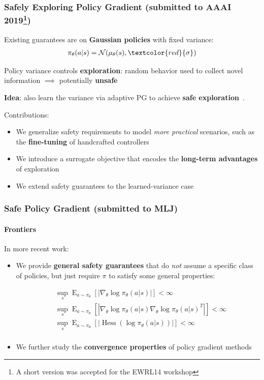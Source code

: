 \documentclass{beamer}
\begin{document}
\begin{frame}
\frametitle{Safely Exploring Policy Gradient \small(submitted to AAAI 2019\footnote{A short version was accepted for the EWRL14 workshop})}
Existing guarantees are on \textbf{Gaussian policies} with fixed variance:
\begin{align*}
	\pi_{\theta}(a \vert s) = \mathcal{N}(\mu_{\theta}(s), \textcolor{red}{\mathbf{\sigma}})
\end{align*}

Policy variance controls \textbf{exploration}: random behavior used to collect novel information $\implies$ potentially \textbf{unsafe}

\vfill

\textbf{Idea}: also learn the variance via adaptive PG to achieve \textbf{safe exploration}~\cite{amodei2016concrete}.

\vfill

Contributions:
\begin{itemize}
	\item We generalize safety requirements to model \textit{more practical} scenarios, such as the \textbf{fine-tuning} of handcrafted controllers
	\item We introduce a surrogate objective that encodes the \textbf{long-term advantages} of exploration
	\item We extend safety guarantees to the learned-variance case
\end{itemize}
\end{frame}


\begin{frame}
\frametitle{Safe Policy Gradient \small(submitted to MLJ)}
\framesubtitle{Frontiers}
In more recent work:
\begin{itemize}
	\item We provide \textbf{general safety guarantees} that do \textit{not} assume a specific class of policies, but just require $\pi$ to satisfy some general properties:
	
	\begin{align*}
		&\sup_{s}\mathop{E}_{a\sim\pi_{\theta}}\left[\left|\nabla_{\theta}\log\pi_{\theta}(a\vert s)\right|\right] < \infty \\
		&\sup_{s}\mathop{E}_{a\sim\pi_{\theta}}\left[\left|\nabla_{\theta}\log\pi_{\theta}(a\vert s)\nabla_{\theta}\log\pi_{\theta}(a\vert s)^T\right|\right] < \infty \\
		&\sup_{s}\mathop{E}_{a\sim\pi_{\theta}}\left[\left|\mathop{Hess}\left(\log\pi_{\theta}(a\vert s)\right)\right|\right] < \infty \\
	\end{align*}
	
	\item We further study the \textbf{convergence properties} of policy gradient methods
\end{itemize}

\end{frame}
\end{document}
